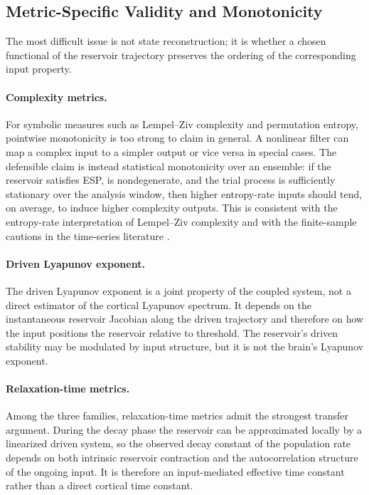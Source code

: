 \subsection{Metric-Specific Validity and Monotonicity}

The most difficult issue is not state reconstruction; it is whether a chosen functional of the reservoir trajectory preserves the ordering of the corresponding input property.

\paragraph{Complexity metrics.}
For symbolic measures such as Lempel--Ziv complexity and permutation entropy, pointwise monotonicity is too strong to claim in general. A nonlinear filter can map a complex input to a simpler output or vice versa in special cases. The defensible claim is instead statistical monotonicity over an ensemble: if the reservoir satisfies ESP, is nondegenerate, and the trial process is sufficiently stationary over the analysis window, then higher entropy-rate inputs should tend, on average, to induce higher complexity outputs. This is consistent with the entropy-rate interpretation of Lempel--Ziv complexity and with the finite-sample cautions in the time-series literature \cite{bandt_permutation_2002,zunino_permutation_2017,little_permutation_2016}.

\paragraph{Driven Lyapunov exponent.}
The driven Lyapunov exponent is a joint property of the coupled system, not a direct estimator of the cortical Lyapunov spectrum. It depends on the instantaneous reservoir Jacobian along the driven trajectory and therefore on how the input positions the reservoir relative to threshold. The reservoir's driven stability may be modulated by input structure, but it is not the brain's Lyapunov exponent.

\paragraph{Relaxation-time metrics.}
Among the three families, relaxation-time metrics admit the strongest transfer argument. During the decay phase the reservoir can be approximated locally by a linearized driven system, so the observed decay constant of the population rate depends on both intrinsic reservoir contraction and the autocorrelation structure of the ongoing input. It is therefore an input-mediated effective time constant rather than a direct cortical time constant.

